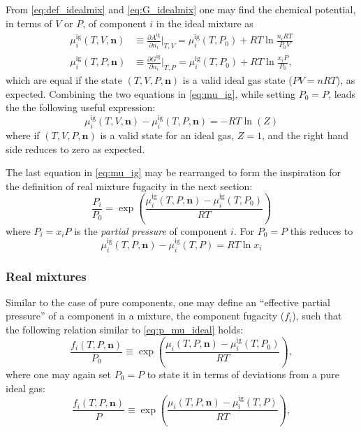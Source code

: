 \documentclass[english]{../thermomemo/thermomemo}
\newcommand{\pone}[3]{\frac{\partial #1}{\partial #2}\bigg|_{#3}}%
\newcommand*{\vektor}[1]{\boldsymbol{#1}}%
\begin{document}
From \eqref{eq:def_idealmix} and \eqref{eq:G_idealmix} 
one may find the chemical potential, in terms of $V$ or $P$, of component $i$ in the ideal mixture as
\begin{align}
  \mu_i^\text{ig}(T,V,\vektor{n}) &\equiv \pone{A^\text{ig}}{n_i}{T,V} = \mu_i^\text{ig}(T,P_0) + RT\ln \frac{n_i RT}{P_0 V} \nonumber \\
  \mu_i^\text{ig}(T,P,\vektor{n}) &\equiv \pone{G^\text{ig}}{n_i}{T,P} = \mu_i^\text{ig}(T,P_0) + RT\ln \frac{x_i P}{P_0},
  \label{eq:mu_ig}
\end{align}
which are equal if the state $(T,V,P,\vektor{n})$ is a valid ideal gas state ($PV=nRT$), as expected. Combining the two 
equations in \eqref{eq:mu_ig}, while setting $P_0=P$, leads the the following useful expression:
\begin{equation}
  \mu_i^\text{ig}(T,V,\vektor{n}) - \mu_i^\text{ig}(T,P,\vektor{n})
  =-RT\ln \left( Z \right)
  \label{eq:mu_ig_PVdiff}
\end{equation}
where if $(T,V,P,\vektor{n})$ is a valid state for an ideal gas, 
$Z=1$, and the right hand side reduces to zero as expected.

The last equation in \eqref{eq:mu_ig} may be rearranged to form the inspiration for the definition of 
real mixture fugacity in the next section:
\begin{equation}
  \frac{P_i}{P_0} = \exp\left( \frac{\mu^\text{ig}_i(T,P,\vektor{n}) - \mu^\text{ig}_i(T,P_0)}{RT} \right)
  \label{eq:p_mu_ideal}
\end{equation}
where $P_i=x_iP$ is the \textit{partial pressure} of component $i$. For $P_0 = P$ this reduces to 
\begin{equation}
  \mu^\text{ig}_i(T,P,\vektor{n}) - \mu^\text{ig}_i(T,P) = RT\ln x_i
  \label{eq:mu_and_xi_idealmix}
\end{equation}

\subsubsection{Real mixtures}
\label{sec:realmixtures}
Similar to the case of pure components, one may define an ``effective partial pressure'' of a component in a mixture, the 
component fugacity ($f_i$), such that the following relation similar to \eqref{eq:p_mu_ideal} holds:
\begin{equation}
  \frac{f_i(T,P,\vektor{n})}{P_0} \equiv \exp\left( \frac{\mu_i(T,P,\vektor{n}) - \mu_i^\text{ig}(T,P_0)}{RT} \right),
  \label{eq:fug_def_mix}
\end{equation}
where one may again set $P_0=P$ to state it in terms of deviations from a pure ideal gas:
\begin{equation}
  \frac{f_i(T,P,\vektor{n})}{P} \equiv \exp\left( \frac{\mu_i(T,P,\vektor{n}) - \mu_i^\text{ig}(T,P)}{RT} \right),
  \label{eq:fug_def_mix_P0eqP}
\end{equation}
\end{document}
